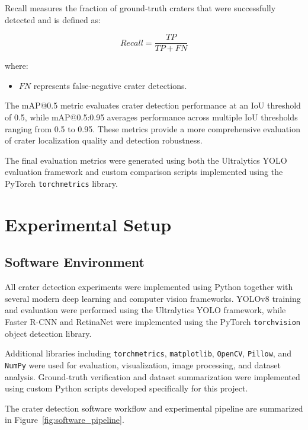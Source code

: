 \documentclass[conference]{IEEEtran}
\begin{document}
	Recall measures the fraction of ground-truth craters that were successfully detected and is defined as:
	
	\begin{equation}
		Recall = \frac{TP}{TP + FN}
	\end{equation}
	
	where:
	\begin{itemize}
		\item $FN$ represents false-negative crater detections.
	\end{itemize}
	
	The mAP@0.5 metric evaluates crater detection performance at an IoU threshold of 0.5, while mAP@0.5:0.95 averages performance across multiple IoU thresholds ranging from 0.5 to 0.95. These metrics provide a more comprehensive evaluation of crater localization quality and detection robustness.
	
	The final evaluation metrics were generated using both the Ultralytics YOLO evaluation framework and custom comparison scripts implemented using the PyTorch \texttt{torchmetrics} library.
	
	\section{Experimental Setup}
	
	\subsection{Software Environment}
	
	All crater detection experiments were implemented using Python together with several modern deep learning and computer vision frameworks. YOLOv8 training and evaluation were performed using the Ultralytics YOLO framework, while Faster R-CNN and RetinaNet were implemented using the PyTorch \texttt{torchvision} object detection library.
	
	Additional libraries including \texttt{torchmetrics}, \texttt{matplotlib}, \texttt{OpenCV}, \texttt{Pillow}, and \texttt{NumPy} were used for evaluation, visualization, image processing, and dataset analysis. Ground-truth verification and dataset summarization were implemented using custom Python scripts developed specifically for this project.
	
	The crater detection software workflow and experimental pipeline are summarized in Figure~\ref{fig:software_pipeline}.
	
\end{document}
